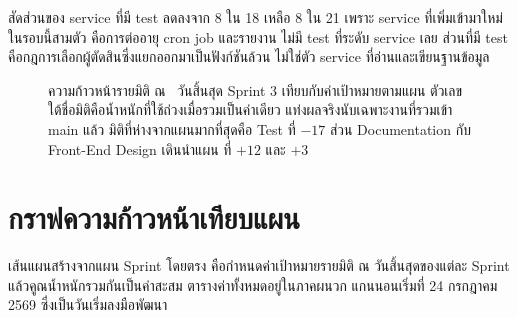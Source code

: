 สัดส่วนของ service ที่มี test ลดลงจาก 8 ใน 18 เหลือ 8 ใน 21 เพราะ service ที่เพิ่มเข้ามาใหม่ในรอบนี้สามตัว คือการต่ออายุ cron job และรายงาน ไม่มี test ที่ระดับ service เลย ส่วนที่มี test คือกฎการเลือกผู้ตัดสินซึ่งแยกออกมาเป็นฟังก์ชันล้วน ไม่ใช่ตัว service ที่อ่านและเขียนฐานข้อมูล


\begin{figure}[H]
\centering
{}
\vspace{0.6em}
\caption{ความก้าวหน้ารายมิติ ณ \reportdate\ วันสิ้นสุด Sprint 3 เทียบกับค่าเป้าหมายตามแผน
 ตัวเลขใต้ชื่อมิติคือน้ำหนักที่ใช้ถ่วงเมื่อรวมเป็นค่าเดียว
 แท่งผลจริงนับเฉพาะงานที่รวมเข้า main แล้ว
 มิติที่ห่างจากแผนมากที่สุดคือ Test ที่ $-17$
 ส่วน Documentation กับ Front-End Design เดินนำแผน ที่ $+12$ และ $+3$}
\label{fig:dims}
\end{figure}

\clearpage
\section{กราฟความก้าวหน้าเทียบแผน}

เส้นแผนสร้างจากแผน Sprint โดยตรง คือกำหนดค่าเป้าหมายรายมิติ ณ วันสิ้นสุดของแต่ละ Sprint แล้วคูณน้ำหนักรวมกันเป็นค่าสะสม ตารางค่าทั้งหมดอยู่ในภาคผนวก แกนนอนเริ่มที่ 24 กรกฎาคม 2569 ซึ่งเป็นวันเริ่มลงมือพัฒนา


